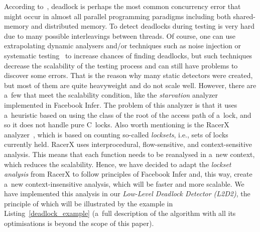 \documentclass{ExcelAtFIT}
\begin{document}
According to~\cite{dogru2011modern}, deadlock is perhaps the most common concurrency error that might occur in almost all parallel programming paradigms including both shared-memory and distributed memory. To detect deadlocks during testing is very hard due to many possible interleavings between threads. Of course, one can use extrapolating dynamic analysers and/or techniques such as noise injection or systematic testing~\cite{conErrors} to increase chances of finding deadlocks, but such techniques decrease the scalability of the testing process and can still have problems to discover some errors. That is the reason why many static detectors were created, but most of them are quite heavyweight and do not scale well. However, there are a~few that meet the scalability condition, like the \textit{starvation} analyzer implemented in Facebook Infer. The problem of this analyzer is that it uses a~heuristic based on using the class of the root of the access path of a~lock, and so it does not handle pure C~locks. Also worth mentioning is the RacerX analyzer~\cite{racerx}, which is based on counting so-called \textit{locksets}, i.e., sets of locks currently held. RacerX uses interprocedural, flow-sensitive, and context-sensitive analysis. This means that each function needs to be reanalysed in a~new context, which reduces the scalability. Hence, we have decided to adapt the \textit{lockset analysis} from RacerX to follow principles of Facebook Infer and, this way, create a~new context-insensitive analysis, which will be faster and more scalable. We have implemented this analysis in our \textit{Low-Level Deadlock Detector (L2D2)}, the principle of which will be illustrated by the example in Listing~\ref{deadlock_example} (a~full description of the algorithm with all its optimisations is beyond the scope of this paper).
\end{document}

